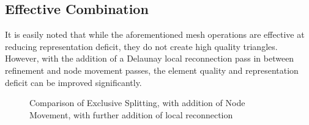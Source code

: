 \subsection{Effective Combination}
It is easily noted that while the aforementioned mesh operations are
effective at reducing representation deficit, they do not create high
quality triangles.  However, with the addition of a Delaunay local
reconnection pass in between refinement and node movement passes, the
element quality and representation deficit can be improved
significantly.

\begin{figure}[h!]
  \begin{center}
  \caption{Comparison of Exclusive Splitting, with addition of Node
Movement, with further addition of local reconnection}
  \label{fig_NodeSmoothing}
  \end{center}
\end{figure}


